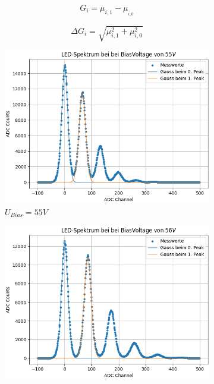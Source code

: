 \documentclass[12pt]{article}
\begin{document}
\begin{equation}
    G_i = \mu_{i,1} -  \mu__{i,0}
    \label{GainFormel}
\end{equation}


\begin{equation}
    \Delta G_i = \sqrt{\mu_{i,1}^2 +  \mu_{i,0}^2}
    \label{GainFormelFehler}
\end{equation}

    

\begin{figure}[h!]
  \centering
  \begin{subfigure}{0.32\textwidth}
    \includegraphics[width=\textwidth]{Grafiken/gaussfit_55}
    \caption{$U_{Bias}=55V$}
  \end{subfigure}
  \hfill
  \begin{subfigure}{0.32\textwidth}
    \includegraphics[width=\textwidth]{Grafiken/gaussfit_56}

\end{subfigure}
\end{figure}
\end{document}
